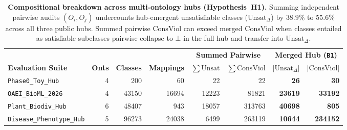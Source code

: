 \documentclass[10pt]{article}
\theoremstyle{accentdef}
\newcommand{\ClaspDiseasePhenotypeHubOnts}{5}
\newcommand{\ClaspDiseasePhenotypeHubClasses}{96273}
\newcommand{\ClaspDiseasePhenotypeHubMappings}{24038}
\newcommand{\ClaspDiseasePhenotypeHubRawUnsat}{10644}
\newcommand{\ClaspDiseasePhenotypeHubRawConsViol}{234152}
\newcommand{\ClaspDiseasePhenotypeHubPairwiseUnsat}{6499}
\newcommand{\ClaspDiseasePhenotypeHubPairwiseConsViol}{263119}
\newcommand{\ClaspOAEIBioMLOnts}{4}
\newcommand{\ClaspOAEIBioMLClasses}{43150}
\newcommand{\ClaspOAEIBioMLMappings}{16694}
\newcommand{\ClaspOAEIBioMLRawUnsat}{23619}
\newcommand{\ClaspOAEIBioMLRawConsViol}{33192}
\newcommand{\ClaspOAEIBioMLPairwiseUnsat}{12223}
\newcommand{\ClaspOAEIBioMLPairwiseConsViol}{81821}
\newcommand{\ClaspPhaseToyHubOnts}{4}
\newcommand{\ClaspPhaseToyHubClasses}{200}
\newcommand{\ClaspPhaseToyHubMappings}{60}
\newcommand{\ClaspPhaseToyHubRawUnsat}{26}
\newcommand{\ClaspPhaseToyHubRawConsViol}{30}
\newcommand{\ClaspPhaseToyHubPairwiseUnsat}{22}
\newcommand{\ClaspPhaseToyHubPairwiseConsViol}{22}
\newcommand{\ClaspPlantBiodivHubOnts}{6}
\newcommand{\ClaspPlantBiodivHubClasses}{48407}
\newcommand{\ClaspPlantBiodivHubMappings}{943}
\newcommand{\ClaspPlantBiodivHubRawUnsat}{40698}
\newcommand{\ClaspPlantBiodivHubRawConsViol}{805}
\newcommand{\ClaspPlantBiodivHubPairwiseUnsat}{18057}
\newcommand{\ClaspPlantBiodivHubPairwiseConsViol}{313763}
\begin{document}
\begin{table}[t]
\centering
\caption{\textbf{Compositional breakdown across multi-ontology hubs (Hypothesis~H1).} Summing independent pairwise audits $(O_i, O_j)$ undercounts hub-emergent unsatisfiable classes ($\mathrm{Unsat}_{\Delta}$) by $38.9\%$ to $55.6\%$ across all three public hubs. Summed pairwise $\mathrm{ConsViol}$ can exceed merged $\mathrm{ConsViol}$ when classes entailed as satisfiable subclasses pairwise collapse to $\bot$ in the full hub and transfer into $\mathrm{Unsat}_{\Delta}$.}
\label{tab:h1_breakdown}
\small
\setlength{\tabcolsep}{5.2pt}
\begin{tabularx}{\textwidth}{@{}Xrrrrrrr@{}}
\toprule
& & & & \multicolumn{2}{c}{\textbf{Summed Pairwise}} & \multicolumn{2}{c}{\textbf{Merged Hub (\texttt{B1})}} \\
\cmidrule(lr){5-6}\cmidrule(l){7-8}
\textbf{Evaluation Suite} & \textbf{Onts} & \textbf{Classes} & \textbf{Mappings} & $\sum \mathrm{Unsat}$ & $\sum \mathrm{ConsViol}$ & $|\mathrm{Unsat}_{\Delta}|$ & $|\mathrm{ConsViol}|$ \\
\midrule
\texttt{Phase0\_Toy\_Hub} & \ClaspPhaseToyHubOnts{} & \num{\ClaspPhaseToyHubClasses} & \num{\ClaspPhaseToyHubMappings} & \num{\ClaspPhaseToyHubPairwiseUnsat} & \num{\ClaspPhaseToyHubPairwiseConsViol} & \textbf{\num{\ClaspPhaseToyHubRawUnsat}} & \textbf{\num{\ClaspPhaseToyHubRawConsViol}} \\
\texttt{OAEI\_BioML\_2026} & \ClaspOAEIBioMLOnts{} & \num{\ClaspOAEIBioMLClasses} & \num{\ClaspOAEIBioMLMappings} & \num{\ClaspOAEIBioMLPairwiseUnsat} & \num{\ClaspOAEIBioMLPairwiseConsViol} & \textbf{\num{\ClaspOAEIBioMLRawUnsat}} & \textbf{\num{\ClaspOAEIBioMLRawConsViol}} \\
\texttt{Plant\_Biodiv\_Hub} & \ClaspPlantBiodivHubOnts{} & \num{\ClaspPlantBiodivHubClasses} & \num{\ClaspPlantBiodivHubMappings} & \num{\ClaspPlantBiodivHubPairwiseUnsat} & \num{\ClaspPlantBiodivHubPairwiseConsViol} & \textbf{\num{\ClaspPlantBiodivHubRawUnsat}} & \textbf{\num{\ClaspPlantBiodivHubRawConsViol}} \\
\texttt{Disease\_Phenotype\_Hub} & \ClaspDiseasePhenotypeHubOnts{} & \num{\ClaspDiseasePhenotypeHubClasses} & \num{\ClaspDiseasePhenotypeHubMappings} & \num{\ClaspDiseasePhenotypeHubPairwiseUnsat} & \num{\ClaspDiseasePhenotypeHubPairwiseConsViol} & \textbf{\num{\ClaspDiseasePhenotypeHubRawUnsat}} & \textbf{\num{\ClaspDiseasePhenotypeHubRawConsViol}} \\
\bottomrule
\end{tabularx}
\end{table}
\end{document}

